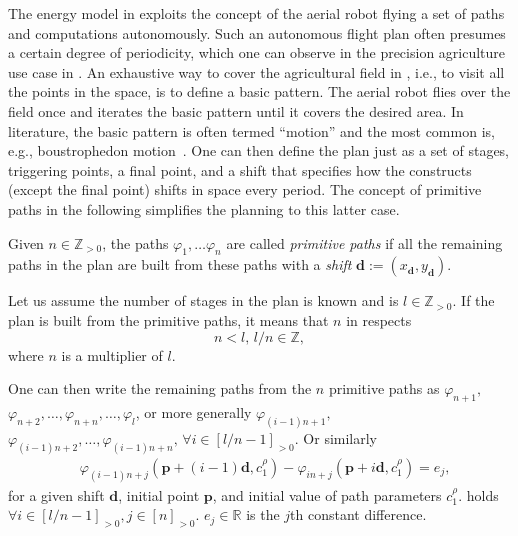 The energy model in  exploits the concept of the aerial robot flying a set of paths and computations autonomously. Such an autonomous flight plan often presumes a certain degree of periodicity, which one can observe in the precision agriculture use case in . An exhaustive way to cover the agricultural field in , i.e., to visit all the points in the space, is to define a basic pattern. The aerial robot flies over the field once and iterates the basic pattern until it covers the desired area. In literature, the basic pattern is often termed ``motion'' and the most common is, e.g., boustrophedon motion~\citep{choset2005principles,choset2001coverage,cabreira2019survey,galceran2013survey}. One can then define the plan just as a set of stages, triggering points, a final point, and a shift that specifies how the constructs (except the final point) shifts in space every period. The concept of primitive paths in the following simplifies the planning to this latter case.

\begin{defn}
  \label{def:primitive}
  Given $n\in\mathbb{Z}_{>0}$, the paths $\varphi_1,\dots\varphi_n$ are called \emph{primitive paths} if all the remaining paths in the plan are built from these paths with a \emph{shift} $\mathbf{d}:=(x_{\mathbf{d}},y_{\mathbf{d}})$. 
\end{defn}

Let us assume the number of stages in the plan is known and is $l\in\mathbb{Z}_{>0}$. If the plan is built from the primitive paths, it means that $n$ in  respects
\begin{equation}
  n<l,\,l/n\in\mathbb{Z},
\end{equation}
where $n$ is a multiplier of $l$. 

One can then write the remaining paths from the $n$ primitive paths as $\varphi_{n+1},$ $\varphi_{n+2},\dots,\varphi_{n+n},\dots,\varphi_l$, or more generally $\varphi_{(i-1)n+1},$ $\varphi_{(i-1)n+2},\dots,\varphi_{(i-1)n+n},\,\forall i\in[l/n-1]_{>0}$. Or similarly
\begin{equation}\label{eq:primitive}\begin{split}
  &\varphi_{(i-1)n+j}(\mathbf{p}+(i-1)\mathbf{d},c_1^\rho)-\varphi_{in+j}(\mathbf{p}+i\mathbf{d},c_1^\rho)=e_j,
\end{split}\end{equation}
for a given shift $\mathbf{d}$, initial point $\mathbf{p}$, and initial value of path parameters $c_1^\rho$.  holds $\forall i\in[l/n-1]_{>0},j\in[n]_{>0}$. $e_j\in\mathbb{R}$ is the $j$th constant difference.

